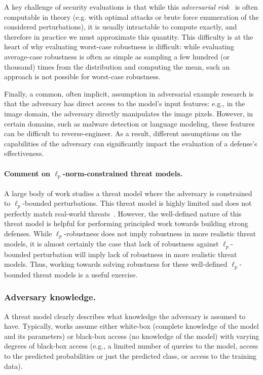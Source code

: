 \documentclass{article} %
\begin{document}
A key challenge of security evaluations is that while this
\emph{adversarial risk}~\citep{madry2017towards,uesato2018adversarial}
is often computable in theory (e.g. with optimal attacks or brute force enumeration of the considered perturbations),
it is usually intractable to compute exactly, and therefore
 in practice we must approximate this quantity.
%
This difficulty is at the heart of why evaluating worst-case robustness is difficult:
while evaluating average-case robustness is often as simple as sampling a few
hundred (or thousand) times from the distribution and computing the mean, such
an approach is not possible for worst-case robustness.

Finally, a common, often implicit, assumption in adversarial example
research is that the adversary has direct access to the model's input
features: e.g., in the image domain, the adversary directly manipulates the image pixels.
%
However, in certain domains, such as malware detection or language
modeling, these features can be difficult to reverse-engineer.
%
As a result, different assumptions on the capabilities of the
adversary can significantly impact the evaluation of a defense's effectiveness.

\paragraph{Comment on $\ell_p$-norm-constrained threat models.}
%
A large body of work studies a threat model where the adversary is 
constrained to $\ell_p$-bounded perturbations.
%
This threat model is highly limited and does not perfectly match real-world
threats~\citep{engstrom2017rotation,gilmer2018motivating}.
%
However, the well-defined nature of this threat model is helpful
for performing principled work towards building strong defenses.
%
While $\ell_p$-robustness does not imply robustness in more realistic
threat models, it is almost certainly the case that lack of robustness
against $\ell_p$-bounded perturbation will imply lack of robustness in more
realistic threat models.
%
Thus, working towards solving robustness
for these well-defined $\ell_p$-bounded threat models
is a useful exercise.

\subsubsection{Adversary knowledge.}
A threat model clearly describes what knowledge the adversary
is assumed to have.
%
Typically, works assume either white-box  (complete knowledge
of the model and its parameters) or black-box access (no knowledge of the model)
with varying degrees of black-box access
(e.g., a limited number of queries to the model, access to the
predicted probabilities or just the predicted class,
or access to the training data).
\end{document}
